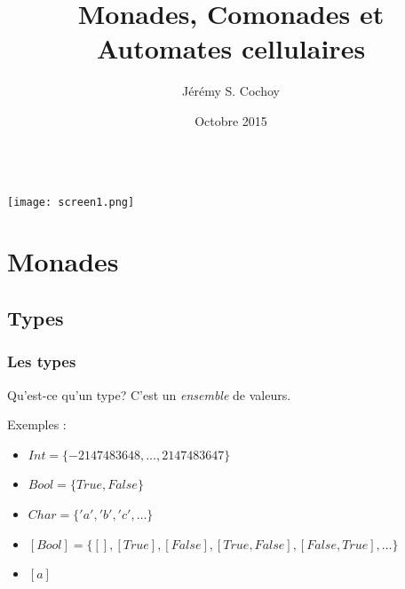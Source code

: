\documentclass{beamer}
\begin{document}
\title{Monades, Comonades et Automates cellulaires}
\author{Jérémy S. Cochoy}
\date{Octobre 2015}


\begin{frame}
\titlepage
\end{frame}

\begin{frame}
  \begin{columns}[t]
  \begin{column}{5cm}
  \tableofcontents[sections={1-3}]
  \end{column}
  \begin{column}{5cm}
  \tableofcontents[sections={4-8}]
  \end{column}
  \end{columns}
\end{frame}

\begin{frame}

\begin{center}
\texttt{[image: screen1.png]}
\end{center}

\end{frame}

\section{Monades}

\subsection{Types}
\begin{frame}
\frametitle{Les types}
\begin{block}{Qu'est-ce qu'un type?}
C'est un \emph{ensemble} de valeurs.
\end{block}
\pause
\begin{exampleblock}{Exemples :}
\begin{itemize}
\item $Int = \{-2 147 483 648, \dots, 2 147 483 647\}$
\item $Bool = \{True, False\}$
\item $Char = \{'a', 'b', 'c' , \dots\}$
\pause
\item $[Bool] = \{[], [True], [False], [True, False], [False, True], \dots\}$
\pause
\item $[a]$
\end{itemize}

\end{exampleblock}
\end{frame}
\end{document}
